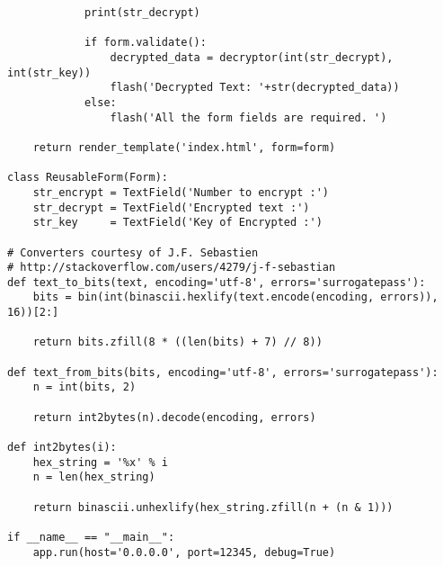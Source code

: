 \documentclass[a4paper]{article}
\begin{document}
\begin{verbatim}
            print(str_decrypt)
     
            if form.validate():
                decrypted_data = decryptor(int(str_decrypt), int(str_key))
                flash('Decrypted Text: '+str(decrypted_data))
            else:
                flash('All the form fields are required. ')             
 
    return render_template('index.html', form=form)

class ReusableForm(Form):
    str_encrypt = TextField('Number to encrypt :')
    str_decrypt = TextField('Encrypted text :')
    str_key     = TextField('Key of Encrypted :')

# Converters courtesy of J.F. Sebastien
# http://stackoverflow.com/users/4279/j-f-sebastian
def text_to_bits(text, encoding='utf-8', errors='surrogatepass'):
    bits = bin(int(binascii.hexlify(text.encode(encoding, errors)), 16))[2:]
    
    return bits.zfill(8 * ((len(bits) + 7) // 8))

def text_from_bits(bits, encoding='utf-8', errors='surrogatepass'):
    n = int(bits, 2)
    
    return int2bytes(n).decode(encoding, errors)

def int2bytes(i):
    hex_string = '%x' % i
    n = len(hex_string)
    
    return binascii.unhexlify(hex_string.zfill(n + (n & 1)))

if __name__ == "__main__":
    app.run(host='0.0.0.0', port=12345, debug=True)

\end{verbatim}
\end{document}
